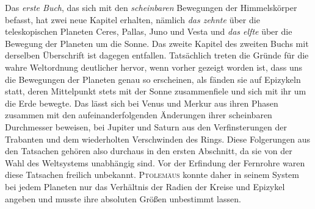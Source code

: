 Das \emph{erste Buch}, das sich mit den \emph{scheinbaren} Bewegungen der Himmelskörper befasst, hat zwei neue Kapitel erhalten, nämlich \emph{das zehnte} über die teleskopischen Planeten Ceres, Pallas, Juno und Vesta und \emph{das elfte} über die Bewegung der Planeten um die Sonne. Das zweite Kapitel des zweiten Buchs mit derselben Überschrift ist dagegen entfallen. Tatsächlich treten die Gründe für die wahre Weltordnung deutlicher hervor, wenn vorher gezeigt worden ist, dass uns die Bewegungen der Planeten genau so erscheinen, als fänden sie auf Epizykeln statt, deren Mittelpunkt stets mit der Sonne zusammenfiele und sich mit ihr um die Erde bewegte. Das lässt sich bei Venus und Merkur aus ihren Phasen zusammen mit den aufeinanderfolgenden Änderungen ihrer scheinbaren Durchmesser beweisen, bei Jupiter und Saturn aus den Verfinsterungen der Trabanten und dem wiederholten Verschwinden des Rings. Diese Folgerungen aus den Tatsachen gehören also durchaus in den ersten Abschnitt, da sie von der Wahl des Weltsystems unabhängig sind. Vor der Erfindung der Fernrohre waren diese Tatsachen freilich unbekannt. \textsc{Ptolemäus} konnte daher in seinem System bei jedem Planeten nur das Verhältnis der Radien der Kreise und Epizykel angeben und musste ihre absoluten Größen unbestimmt lassen.

